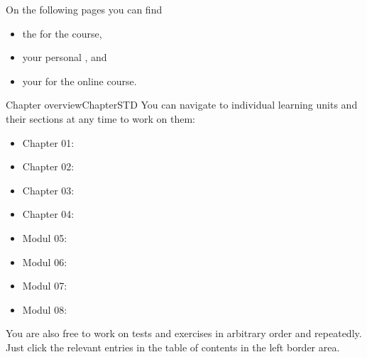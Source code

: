 \ifttm
\MSetSubject{\MINTPhysics}

\begin{MSectionStart}
On the following pages you can find
\begin{itemize}
\item{the  for the course,}
\item{your personal ,} and
\item{your  for the online course.}
\end{itemize}
\end{MSectionStart}


\begin{MXContent}{Chapter overview}{Chapter}{STD}
\MGlobalChapterTag
You can navigate to individual learning units and their sections at any time to work on them:
\begin{itemize}
\item{Chapter 01: }
\item{Chapter 02: }
\item{Chapter 03: }
\item{Chapter 04: }
\item{Modul 05: }
\item{Modul 06: }
\item{Modul 07: }
\item{Modul 08: }
\end{itemize}
You are also free to work on tests and exercises in arbitrary order and repeatedly.
Just click the relevant entries in the table of contents in the left border area.
\end{MXContent}


